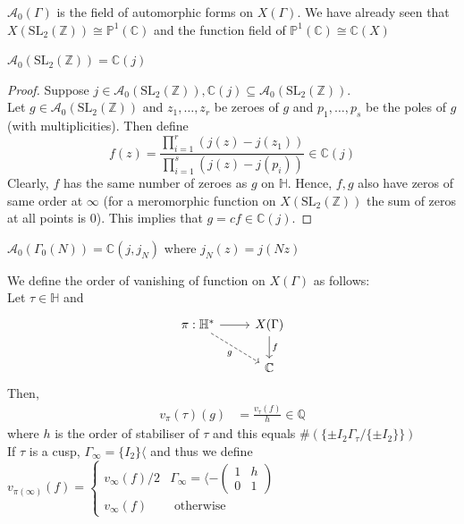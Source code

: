 \documentclass[oneside, 12pt]{scrbook}
\newcommand{\CC}{\mathbb C}
\newcommand{\QQ}{\mathbb Q}
\newcommand{\ZZ}{\mathbb Z}
\newcommand{\PP}{\mathbb{P}}
\newcommand{\SL}{\mathrm{SL}}
\newcommand{\HH}{\mathbb{H}}
\theoremstyle{theorem}
\begin{document}
$\mathcal{A}_{0}(\Gamma)$ is the field of automorphic forms on $X(\Gamma)$. We have already seen that $X(\SL_{2}(\ZZ)) \cong \PP^1 (\CC)$ and the function field of $\PP^1 (\CC) \cong \CC(X)$

\begin{proposition}
$\mathcal{A}_{0}(\SL_{2}(\ZZ)) = \CC(j)$
\end{proposition}

\begin{proof}
Suppose $j \in \mathcal{A}_{0}(\SL_{2}(\ZZ)), \CC(j) \subseteq \mathcal{A}_{0} (\SL_{2}(\ZZ))$. \\
Let $g \in \mathcal{A}_{0}(\SL_{2}(\ZZ))$ and $z_{1}, \hdots , z_{r}$ be zeroes of $g$ and $p_{1}, \hdots , p_{s}$ be the poles of $g$ (with multiplicities). Then define $$f(z) = \frac{\prod_{i=1}^r (j(z) - j(z_{1}))}{\prod_{i=1}^s (j(z) - j(p_{i}))} \in \CC(j)$$
Clearly, $f$ has the same number of zeroes as $g$ on $\HH$. Hence, $f,g$ also have zeros of same order at $\infty$ (for a meromorphic function on $X(\SL_{2}(\ZZ))$ the sum of zeros at all points is $0$). This implies that $g=cf \in \CC(j)$.
\end{proof}

\begin{remark}[Fact]
$\mathcal{A}_{0}(\Gamma_{0}(N)) = \CC(j,j_{N})$ where $j_{N}(z) = j(Nz)$
\end{remark}

We define the order of vanishing of function on $X(\Gamma)$ as follows: \\

Let $\tau \in \HH$ and 
\[\begin{tikzcd}
	{\pi: \mathbb{H}^{*}} & {X(\Gamma)} \\
	& {\mathbb{C}}
	\arrow[from=1-1, to=1-2]
	\arrow["f", from=1-2, to=2-2]
	\arrow["g"', dashed, from=1-1, to=2-2]
\end{tikzcd}\]
Then, 
\begin{eqnarray}
v_{\pi}(\tau) (g) &= \frac{v_{\tau}(f)}{h} \in \QQ
\end{eqnarray}
where $h$ is the order of stabiliser of $\tau$ and this equals $\# (\{\pm I_{2} \Gamma_{\tau}/\{\pm I_{2}\}\})$\\

If $\tau$ is a cusp, $\Gamma_{\infty} = \{I_{2}\} \langle $ and thus we define \\

$v_{\pi (\infty)}(f) = \begin{cases} v_{\infty} (f)/2 & \Gamma_{\infty} = \langle -\begin{pmatrix}
1 & h \\ 0 & 1
\end{pmatrix}  \\ v_{\infty}(f) & \text{ otherwise }\end{cases}$
\end{document}
